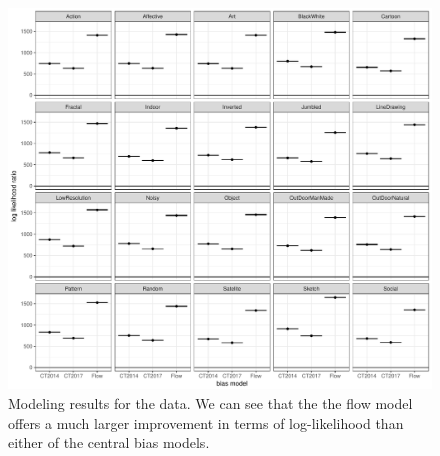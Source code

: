 \documentclass[a4paper, twocolumn, oneside, 11pt]{article}
\begin{document}
\begin{figure}
\centering
 \includegraphics[width=13cm]{../scripts/flow/figs/llh_trainingBorji.pdf}
\caption{Modeling results for the \cite{borji2015} data. We can see that the the flow model offers a much larger improvement in terms of log-likelihood than either of the central bias models.}
\label{fig:nFlowDevBorji}
\end{figure}


\small

\end{document}
